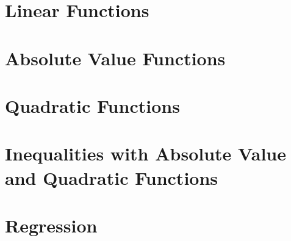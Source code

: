 \section{Linear Functions}



\newpage

\section{Absolute Value Functions}



\newpage

\section{Quadratic Functions}



\newpage

\section{Inequalities with Absolute Value and Quadratic Functions}



\newpage

\section{Regression}



\newpage